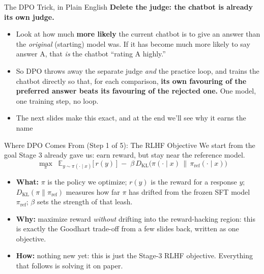 \begin{frame}{The DPO Trick, in Plain English}
\textbf{Delete the judge: the chatbot is already its own judge.}
\begin{itemize}\itemsep0.55em
    \item Look at how much \textbf{more likely} the current chatbot is to give an
          answer than the \emph{original} (starting) model was. If it has become much
          more likely to say answer A, that \emph{is} the chatbot ``rating A
          highly.'' 
    \item So DPO throws away the separate judge \emph{and} the practice loop, and
          trains the chatbot directly so that, for each comparison, \textbf{its own
          favouring of the preferred answer beats its favouring of the rejected
          one.} One model, one training step, no loop.
    \item The next slides make this exact, and at the end we'll see why it earns
          the name 
\end{itemize}
\end{frame}

\begin{frame}{Where DPO Comes From (Step 1 of 5): The RLHF Objective}
We start from the goal Stage 3 already gave us: earn reward, but stay near the
reference model.
\[
    \max_{\pi}\;\; \mathbb{E}_{y\sim\pi(\cdot\mid x)}\big[\, r(y)\, \big]
    \;-\; \beta\, D_{\mathrm{KL}}\!\big(\pi(\cdot\mid x)\, \big\|\, \pi_{\text{ref}}(\cdot\mid x)\big)
\]
\begin{itemize}\itemsep0.45em\small
    \item \textbf{What:} $\pi$ is the policy we optimize; $r(y)$ is the reward for a
          response $y$; $D_{\mathrm{KL}}(\pi\|\pi_{\text{ref}})$ measures how far
          $\pi$ has drifted from the frozen SFT model $\pi_{\text{ref}}$; $\beta$
          sets the strength of that leash.
    \item \textbf{Why:} maximize reward \emph{without} drifting into the
          reward-hacking region: this is exactly the Goodhart trade-off from a few
          slides back, written as one objective.
    \item \textbf{How:} nothing new yet: this is just the Stage-3 RLHF objective.
          Everything that follows is solving it on paper.
\end{itemize}
\end{frame}


